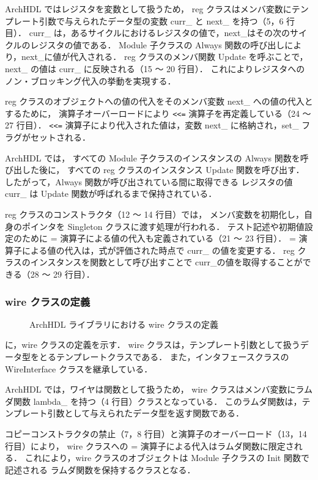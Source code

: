 ArchHDL ではレジスタを変数として扱うため，
reg クラスはメンバ変数にテンプレート引数で与えられたデータ型の変数 curr\_ と next\_ を持つ（5，6 行目）．
curr\_ は，あるサイクルにおけるレジスタの値で，next\_はその次のサイクルのレジスタの値である．
Module 子クラスの Always 関数の呼び出しにより，next\_に値が代入される．
reg クラスのメンバ関数 Update を呼ぶことで，next\_ の値は curr\_ に反映される（15 ～ 20 行目）．
これによりレジスタへのノン・ブロッキング代入の挙動を実現する．

reg クラスのオブジェクトへの値の代入をそのメンバ変数 next\_ への値の代入とするために，
演算子オーバーロードにより \verb`<<=` 演算子を再定義している（24 ～ 27 行目）．
\verb`<<=` 演算子により代入された値は，変数 next\_ に格納され，set\_ フラグがセットされる．

ArchHDL では，
すべての Module 子クラスのインスタンスの Always 関数を呼び出した後に，
すべての reg クラスのインスタンス Update 関数を呼び出す．
したがって，Always 関数が呼び出されている間に取得できる
レジスタの値 curr\_ は Update 関数が呼ばれるまで保持されている．

reg クラスのコンストラクタ（12 ～ 14 行目）では，
メンバ変数を初期化し，自身のポインタを Singleton クラスに渡す処理が行われる．
テスト記述や初期値設定のために = 演算子による値の代入も定義されている（21 ～ 23 行目）．
= 演算子による値の代入は，式が評価された時点で curr\_ の値を変更する．
reg クラスのインスタンスを関数として呼び出すことで curr\_の値を取得することができる（28 ～ 29 行目）．


\subsubsection{wire クラスの定義}

\begin{figure}[t]
 
 \caption{ArchHDL ライブラリにおける wire クラスの定義}
 \label{src:wire}
\end{figure}

 に，wire クラスの定義を示す．
wire クラスは，テンプレート引数として扱うデータ型をとるテンプレートクラスである．
また，インタフェースクラスの WireInterface クラスを継承している．

ArchHDL では，ワイヤは関数として扱うため，
wire クラスはメンバ変数にラムダ関数 lambda\_ を持つ（4 行目）クラスとなっている．
このラムダ関数は，テンプレート引数として与えられたデータ型を返す関数である．

コピーコンストラクタの禁止（7，8 行目）と演算子のオーバーロード（13，14 行目）により，
wire クラスへの = 演算子による代入はラムダ関数に限定される．
これにより，wire クラスのオブジェクトは Module 子クラスの Init 関数で記述される
ラムダ関数を保持するクラスとなる．

